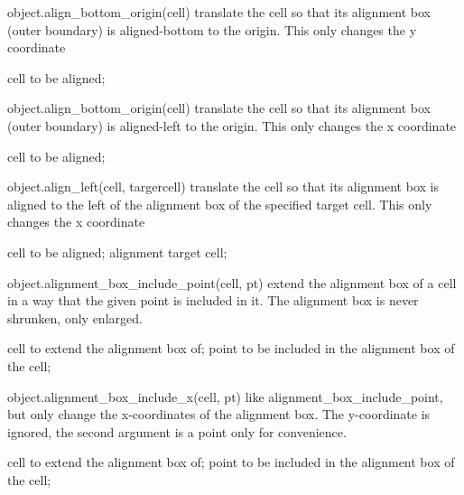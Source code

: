 \begin{APIfunc}{object.align\_bottom\_origin(cell)}
    translate the cell so that its alignment box (outer boundary) is aligned-bottom to the origin. This only changes the y coordinate
    \begin{APIparameters}
            cell to be aligned;
    \end{APIparameters}
\end{APIfunc}
\begin{APIfunc}{object.align\_bottom\_origin(cell)}
    translate the cell so that its alignment box (outer boundary) is aligned-left to the origin. This only changes the x coordinate
    \begin{APIparameters}
            cell to be aligned;
    \end{APIparameters}
\end{APIfunc}
\begin{APIfunc}{object.align\_left(cell, targercell)}
    translate the cell so that its alignment box is aligned to the left of the alignment box of the specified target cell. This only changes the x coordinate
    \begin{APIparameters}
            cell to be aligned;
            alignment target cell;
    \end{APIparameters}
\end{APIfunc}
\begin{APIfunc}{object.alignment\_box\_include\_point(cell, pt)}
    extend the alignment box of a cell in a way that the given point is included in it. The alignment box is never shrunken, only enlarged.
    \begin{APIparameters}
            cell to extend the alignment box of;
            point to be included in the alignment box of the cell;
    \end{APIparameters}
\end{APIfunc}
\begin{APIfunc}{object.alignment\_box\_include\_x(cell, pt)}
    like alignment\_box\_include\_point, but only change the x-coordinates of the alignment box. The y-coordinate is ignored, the second argument is a point only for convenience.
    \begin{APIparameters}
            cell to extend the alignment box of;
            point to be included in the alignment box of the cell;
    \end{APIparameters}
\end{APIfunc}
